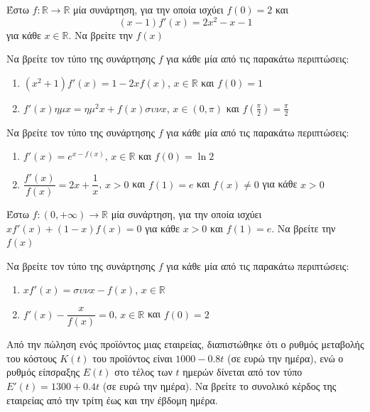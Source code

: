 \documentclass{presentation}
\begin{document}
\begin{askisi}
  Έστω $f:\mathbb{R}\to\mathbb{R}$ μία συνάρτηση, για την οποία ισχύει $f(0)=2$ και
  $$(x-1)f'(x)=2x^2-x-1$$
  για κάθε $x\in\mathbb{R}$. Να βρείτε την $f(x)$
\end{askisi}

\begin{askisi}
  Να βρείτε τον τύπο της συνάρτησης $f$ για κάθε μία από τις παρακάτω περιπτώσεις:
  \begin{enumerate}[<+->]
    \item $(x^2+1)f'(x)=1-2xf(x)$, $x\in\mathbb{R}$ και $f(0)=1$
    \item $f'(x)ημx=ημ^2x+f(x)συνx$, $x\in \left( 0,π \right) $ και $f(\frac{π}{2})=\frac{π}{2}$
  \end{enumerate}
\end{askisi}

\begin{askisi}
  Να βρείτε τον τύπο της συνάρτησης $f$ για κάθε μία από τις παρακάτω περιπτώσεις:
  \begin{enumerate}[<+->]
    \item $f'(x)=e^{x-f(x)}$, $x\in\mathbb{R}$ και $f(0)=\ln 2$
    \item $\dfrac{f'(x)}{f(x)}=2x+\dfrac{1}{x}$, $x>0$ και $f(1)=e$ και $f(x)\ne 0$ για κάθε $x>0$
  \end{enumerate}
\end{askisi}

\begin{askisi}
  Έστω $f:(0,+\infty)\to\mathbb{R}$ μία συνάρτηση, για την οποία ισχύει $xf'(x)+(1-x)f(x)=0$ για κάθε $x>0$ και $f(1)=e$. Να βρείτε την $f(x)$
\end{askisi}

\begin{askisi}
  Να βρείτε τον τύπο της συνάρτησης $f$ για κάθε μία από τις παρακάτω περιπτώσεις:
  \begin{enumerate}[<+->]
    \item $xf'(x)=συνx-f(x)$, $x\in\mathbb{R}$
    \item $f'(x)-\dfrac{x}{f(x)}=0$, $x\in\mathbb{R}$ και $f(0)=2$
  \end{enumerate}
\end{askisi}

\begin{askisi}
  Από την πώληση ενός προϊόντος μιας εταιρείας, διαπιστώθηκε ότι ο ρυθμός μεταβολής του κόστους $Κ(t)$ του προϊόντος είναι $1000-0.8t$ (σε ευρώ την ημέρα), ενώ ο ρυθμός είπσραξης $Ε(t)$ στο τέλος των $t$ ημερών δίνεται από τον τύπο $Ε'(t)=1300+0.4t$ (σε ευρώ την ημέρα). Να βρείτε το συνολικό κέρδος της εταιρείας από την τρίτη έως και την έβδομη ημέρα.
\end{askisi}

\moodle
\end{document}
